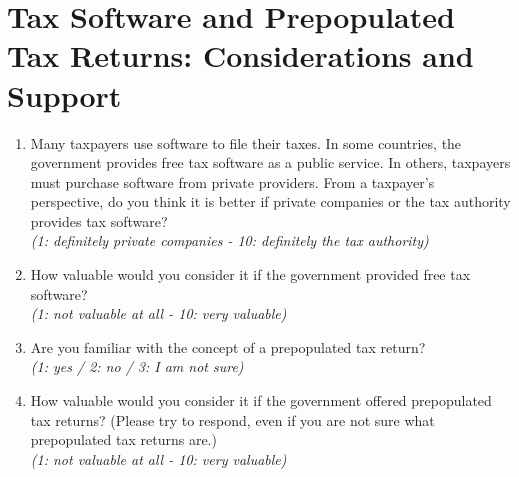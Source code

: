 \documentclass[11pt]{article}
\begin{document}
\section*{Tax Software and Prepopulated Tax Returns: Considerations and Support} 
\begin{enumerate}[resume]
    \item Many taxpayers use software to file their taxes. In some countries, the government provides free tax software as a public service. In others, taxpayers must purchase software from private providers. From a taxpayer’s perspective, do you think it is better if private companies or the tax authority provides tax software? \\
    \textit{(1: definitely private companies - 10: definitely the tax authority)}
    \item How valuable would you consider it if the government provided free tax software?\\
    \textit{(1: not valuable at all - 10: very valuable)}
    \item Are you familiar with the concept of a prepopulated tax return?\\
    \textit{(1: yes / 2: no / 3: I am not sure)}
    \item How valuable would you consider it if the government offered prepopulated tax returns? (Please try to respond, even if you are not sure what prepopulated tax returns are.) \\
    \textit{(1: not valuable at all - 10: very valuable)}
\end{enumerate}
\end{document}
